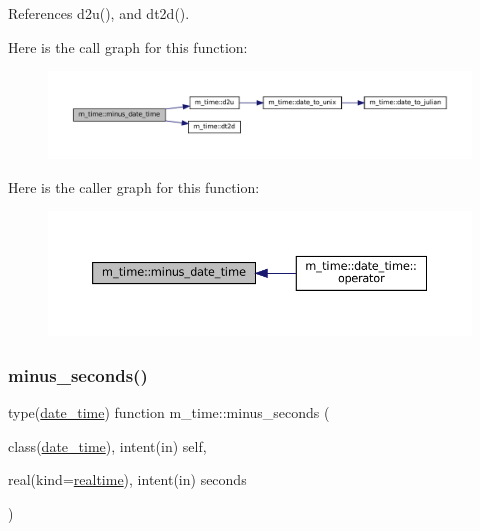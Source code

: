 References d2u(), and dt2d().

Here is the call graph for this function\+:\nopagebreak
\begin{figure}[H]
\begin{center}
\leavevmode
\includegraphics[width=350pt]{namespacem__time_ae81a89463c40f33a14b1b2d49f797643_cgraph}
\end{center}
\end{figure}
Here is the caller graph for this function\+:\nopagebreak
\begin{figure}[H]
\begin{center}
\leavevmode
\includegraphics[width=350pt]{namespacem__time_ae81a89463c40f33a14b1b2d49f797643_icgraph}
\end{center}
\end{figure}
\mbox{\label{namespacem__time_a0d241cbb8f2e30a64b53f4aae4100709}} 
\subsubsection{\texorpdfstring{minus\+\_\+seconds()}{minus\_seconds()}}
{\footnotesize\ttfamily type(\mbox{\hyperlink{structm__time_1_1date__time}{date\+\_\+time}}) function m\+\_\+time\+::minus\+\_\+seconds (\begin{DoxyParamCaption}\item[{class(\mbox{\hyperlink{structm__time_1_1date__time}{date\+\_\+time}}), intent(in)}]{self,  }\item[{real(kind=\mbox{\hyperlink{namespacem__time_ac10ea9e8d59ec74eaa7d89f2517d7422}{realtime}}), intent(in)}]{seconds }\end{DoxyParamCaption})\hspace{0.3cm}{\ttfamily [private]}}



